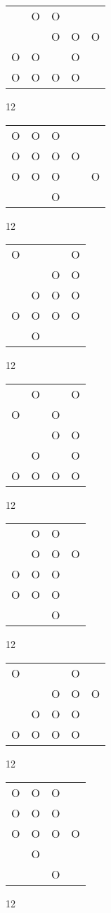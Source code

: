 \begin{tabular}{|m{0.2cm}m{0.2cm}m{0.2cm}m{0.2cm}m{0.2cm}|}\hline
 &O&O& & \\
 & &O&O&O\\
O&O& &O& \\
O&O&O&O& \\
\hline\end{tabular}12
\begin{tabular}{|m{0.2cm}m{0.2cm}m{0.2cm}m{0.2cm}m{0.2cm}|}\hline
O&O&O& & \\
O&O&O&O& \\
O&O&O& &O\\
 & &O& & \\
\hline\end{tabular}12
\begin{tabular}{|m{0.2cm}m{0.2cm}m{0.2cm}m{0.2cm}|}\hline
O& & &O\\
 & &O&O\\
 &O&O&O\\
O&O&O&O\\
 &O& & \\
\hline\end{tabular}12
\begin{tabular}{|m{0.2cm}m{0.2cm}m{0.2cm}m{0.2cm}|}\hline
 &O& &O\\
O& &O& \\
 & &O&O\\
 &O& &O\\
O&O&O&O\\
\hline\end{tabular}12
\begin{tabular}{|m{0.2cm}m{0.2cm}m{0.2cm}m{0.2cm}|}\hline
 &O&O& \\
 &O&O&O\\
O&O&O& \\
O&O&O& \\
 & &O& \\
\hline\end{tabular}12
\begin{tabular}{|m{0.2cm}m{0.2cm}m{0.2cm}m{0.2cm}m{0.2cm}|}\hline
O& & &O& \\
 & &O&O&O\\
 &O&O&O& \\
O&O&O&O& \\
\hline\end{tabular}12
\begin{tabular}{|m{0.2cm}m{0.2cm}m{0.2cm}m{0.2cm}|}\hline
O&O&O& \\
O&O&O& \\
O&O&O&O\\
 &O& & \\
 & &O& \\
\hline\end{tabular}12
